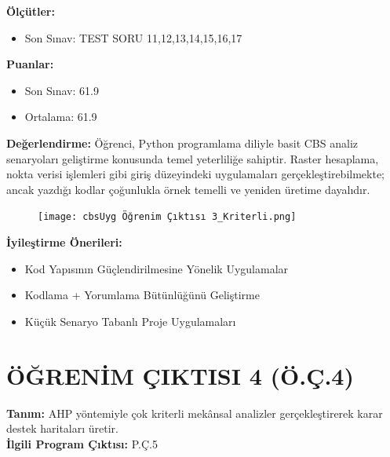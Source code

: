 \documentclass[12pt,a4paper]{article}
\begin{document}
\vspace{0.5cm}
\textbf{Ölçütler:} 
\begin{itemize}
    \item Son Sınav: TEST SORU 11,12,13,14,15,16,17
\end{itemize}

\textbf{Puanlar:} 
\begin{itemize}
    \item Son Sınav: 61.9
    \item Ortalama: 61.9
\end{itemize}

\vspace{0.5cm}
\textbf{Değerlendirme:}
Öğrenci, Python programlama diliyle basit CBS analiz senaryoları geliştirme konusunda temel yeterliliğe sahiptir. Raster hesaplama, nokta verisi işlemleri gibi giriş düzeyindeki uygulamaları gerçekleştirebilmekte; ancak yazdığı kodlar çoğunlukla örnek temelli ve yeniden üretime dayalıdır.

\begin{figure}[H]
 \centering
 \texttt{[image: cbsUyg Öğrenim Çıktısı 3\_Kriterli.png]} %
\end{figure}

\textbf{İyileştirme Önerileri:}
\begin{itemize}
    \item Kod Yapısının Güçlendirilmesine Yönelik Uygulamalar
    \item Kodlama + Yorumlama Bütünlüğünü Geliştirme
    \item Küçük Senaryo Tabanlı Proje Uygulamaları
\end{itemize}

\newpage

\section*{ÖĞRENİM ÇIKTISI 4 (Ö.Ç.4)}
\textbf{Tanım:} AHP yöntemiyle çok kriterli mekânsal analizler gerçekleştirerek karar destek haritaları üretir.\\
\textbf{İlgili Program Çıktısı:} P.Ç.5
\end{document}
